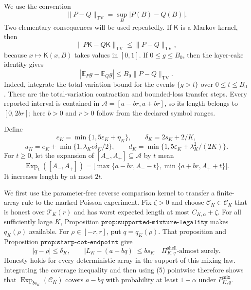 We use the convention
\[
 \lVert P-Q\rVert_{\mathrm{TV}}=\sup_B|P(B)-Q(B)|.
\]
Two elementary consequences will be used repeatedly.  If \(\mathsf K\) is a
Markov kernel, then
\[
 \lVert P\mathsf K-Q\mathsf K\rVert_{\mathrm{TV}}
 \leq \lVert P-Q\rVert_{\mathrm{TV}},
 \tag{1}
\]
because \(x\mapsto\mathsf K(x,B)\) takes values in \([0,1]\).  If
\(0\leq g\leq B_0\), then the layer-cake identity gives
\[
 |\mathbb E_Pg-\mathbb E_Qg|
 \leq B_0\lVert P-Q\rVert_{\mathrm{TV}}.
 \tag{2}
\]
Indeed, integrate the total-variation bound for the events \(\{g>t\}\)
over \(0\leq t\leq B_0\).  These are the total-variation contraction and
bounded-loss transfer steps.  Every reported interval is contained in
\(\mathcal A=[a-br,a+br]\), so its length belongs to \([0,2br]\); here
\(b>0\) and \(r>0\) follow from the declared symbol ranges.

Define
\[
 e_K=\min\{1,5\varepsilon_K+\eta_K\},\qquad
 \delta_K=2s_K+2/K,
\]
\[
 u_K=e_K+\min\{1,\lambda_Kc\delta_K/2\},
 \qquad
 d_K=\min\{1,5\varepsilon_K+\lambda_K^2/(2K)\}.
 \tag{3}
\]
For \(t\geq0\), let the expansion of \([A_-,A_+]\subseteq\mathcal A\)
by \(t\) mean
\[
 \operatorname{Exp}_t([A_-,A_+])
 =\bigl[\max\{a-br,A_--t\},\min\{a+br,A_++t\}\bigr].
 \tag{4}
\]
It increases length by at most \(2t\).

We first use the parameter-free reverse comparison kernel to transfer a
finite-array rule to the marked-Poisson experiment.  Fix \(\zeta>0\) and
choose \(\mathcal C_K\in\mathscr C_K\) that is honest over
\(\mathcal T_K(r)\) and has worst expected length at most
\(C_{K,\alpha}+\zeta\).  For all sufficiently large \(K\), Proposition
\(\texttt{prop:supported-mixture-legality}\) makes \(q_K(\rho)\) available.
For \(\rho\in[-r,r]\), put \(q=q_K(\rho)\).  That proposition and
Proposition \(\texttt{prop:sharp-cot-endpoint}\) give
\[
 |q-\rho|\leq\delta_K,
 \qquad
 |L_K-(a-bq)|\leq bs_K
 \quad\Pi_{K,q}^{\mathrm{shell}}\text{-almost surely}.
 \tag{5}
\]
Honesty holds for every deterministic array in the support of this mixing
law.  Integrating the coverage inequality and then using (5) pointwise
therefore shows that
\(\operatorname{Exp}_{bs_K}(\mathcal C_K)\) covers \(a-bq\) with
probability at least \(1-\alpha\) under \(P^{\mathrm{mix}}_{K,q}\).

